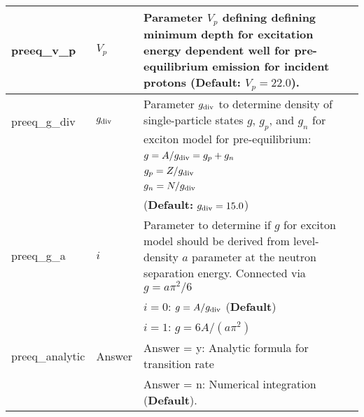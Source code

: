 \documentclass[
10pt,
showpacs,preprintnumbers,nofootinbib,
amsmath,amssymb,
aps,prc,groupedaddress,superscriptaddress,
notitlepage,showkeys
]{revtex4-1}
\begin{document}
\begin{center}
\begin{tabular}{| p{4cm} | p{4cm} | p{9cm} |}
\hline
preeq\_v\_p  & $V_p$  &   Parameter $V_p$ defining defining minimum depth for excitation energy
    dependent well for pre-equilibrium emission for incident protons
    ({\bf Default:} $V_p = 22.0$).\\
\hline
preeq\_g\_div & $ g_{\rm div}$ & Parameter $g_{\rm div}$ to determine density of single-particle states $g$, $g_p$, and $g_n$ for 
    exciton model for pre-equilibrium: \\
 & &    $g = A/g_{\rm div} = g_p + g_n$ \\
 & &     $g_p = Z/g_{\rm div}$\\
 & &     $g_n = N/g_{\rm div}$\\
 & & ({\bf Default:} $g_{\rm div} =15.0$)\\
\hline
preeq\_g\_a  & $i$ &  Parameter to determine if $g$ for exciton model should be derived from 
    level-density $a$ parameter at the neutron separation energy. Connected via 
    $ g = a \pi^2/6$\\
&  &  $i  = 0$:  $g = A/g_{\rm div}$  ({\bf Default})\\
 &  &  $i = 1$: $g = 6A/(a\pi^2)$\\
\hline
preeq\_analytic  &  Answer  &  Answer = y:   Analytic formula for transition rate \\
 &  &     Answer = n:  Numerical integration ({\bf Default}).\\
\hline
\end{tabular}
\end{center}
%
\end{document}
